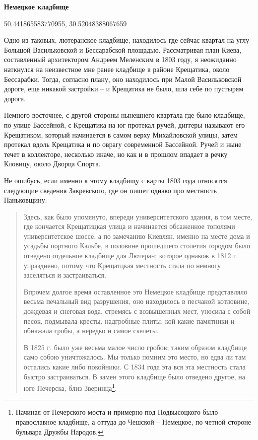 \textbf{Немецкое кладбище} 

50.441865583770955, 30.52048388067659

Одно из таковых, лютеранское кладбище, находилось где сейчас квартал на углу Большой Васильковской и Бессарабской площадью. 
Рассматривая план Киева, составленный архитектором Андреем Меленским в 1803 году,  я неожиданно наткнулся на неизвестное мне ранее кладбище в районе Крещатика, около Бессарабки. Тогда, согласно плану, оно находилось при Малой Васильковской дороге, еще никакой застройки – и Крещатика не было, шла себе по пустырям дорога.

Немного восточнее, с другой стороны нынешнего квартала где было кладбище, по улице Бассейной, с Крещатика на юг протекал ручей, диггеры называют его Крещатиком, который начинается в самом верху Михайловской улицы, затем протекал вдоль Крещатика и по оврагу современной Бассейной. Ручей и ныне течет в коллекторе, несколько иначе, но как и в прошлом впадает в речку Кловицу, около Дворца Спорта.
  
Не ошибусь, если именно к этому кладбищу с карты 1803 года относятся следующие сведения Закревского, где он пишет однако про местность Паньковщину:

\begin{quotation}
Здесь, как было упомянуто, впереди университетского здания, в том месте, где кончается Крещатицкая улица и начинается обсаженное тополями университетское шоссе, а по замечанию Киевлян, именно на месте дома и усадьбы портного Кальбе, в половине прошедшего столетия городом было отведено отдельное кладбище для Лютеран; которое однакож в 1812 г. упразднено, потому что Крещатцкая местность стала по немногу заселяться и застраиваться. 

Впрочем долгое время оставленное это Немецкое кладбище представляло весьма печальный вид разрушения, оно находилось в песчаной котловине, дождевая и снеговая вода, стремясь с возвышенных мест, уносила с собой песок, подмывала кресты, надгробные плиты, кой-какие памятники и обнажала гробы, а нередко и самое скелеты.

В 1825 г. было уже весьма малое число гробов; таким образом кладбище само собою уничтожалось. Мы только помним это место, но едва ли там остались какие либо покойники. С 1834 года эта вся эта местность стала быстро застраиваться. В замен этого кладбище было отведено другое, на юге Печерска, близ Зверинца\footnote{Начиная от Печерского моста и примерно под Подвысоцкого было православное кладбище, а оттуда до Чешской – Немецкое, по четной стороне бульвара Дружбы Народов.}.
\end{quotation}

